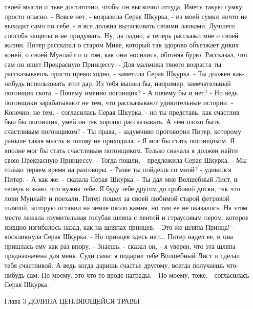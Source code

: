 твоей мысли о льве достаточно, чтобы он выскочил оттуда. Иметь такую 
сумку просто опасно.
    - Вовсе нет, - возразила Серая Шкурка, - из моей сумки ничто не 
выходит само по себе, - я все должна вытаскивать своими лапками. 
Лучшего способа защиты и не придумать. Ну, да ладно, а теперь расскажи 
мне о своей жизни.
    Питер рассказал о старом Мике, который так здорово объезжает диких 
коней, о своей Мунлайт и о том, как они носились, обгоняя бурю. 
Рассказал, что сам он ищет Прекрасную Принцессу.
    - Для мальчика твоего возраста ты рассказываешь просто 
превосходно, - заметила Серая Шкурка. - Ты должен как-нибудь 
использовать этот дар. Из тебя вышел бы, например, замечательный 
погонщик скота.
    - Почему именно погонщик?
    - А почему бы и нет?
    - Но ведь погонщики зарабатывают не тем, что рассказывают 
удивительные истории.
    - Конечно, не тем, - согласилась Серая Шкурка, - но ты представь, 
как счастлив был бы погонщик, умей он так хорошо рассказывать. А чем 
плохо быть счастливым погонщиком?
    - Ты права, - задумчиво проговорил Питер, которому раньше такая 
мысль в голову не приходила. - Я мог бы стать погонщиком. Я вполне мог 
бы стать счастливым погонщиком. Только сначала я должен найти свою 
Прекрасную Принцессу.
    - Тогда пошли, - предложила Серая Шкурка. - Мы только теряем время 
на разговоры.
    - Разве ты пойдешь со мной? - удивился Питер.
    - А как же, - сказала Серая Шкурка. - Ты дал мне Волшебный Лист, и 
теперь я знаю, что нужна тебе. Я буду тебе другом до гробовой доски, 
так что лови Мунлайт и поехали.
    Питер пошел за своей любимой старой фетровой шляпой, которую 
оставил на земле около камня, но там ее не оказалось. На этом месте 
лежала изумительная голубая шляпа с лентой и страусовым пером, которое 
изящно изгибалось назад, как на шляпах принцев.
    - Это же шляпа Принца! - воскликнула Серая Шкурка. - Но принцев 
здесь нет...
    Питер надел ее, и она пришлась ему как раз впору.
    - Знаешь, - сказал он, - я уверен, что эта шляпа предназначена для 
меня. Суди сама: я подарил тебе Волшебный Лист и сделал тебя 
счастливой. А ведь когда даришь счастье другому, всегда получаешь что-
нибудь сам. По-моему, это что-то вроде награды.
    - По-моему, тоже, - согласилась Серая Шкурка.

        Глава 3
        ДОЛИНА ЦЕПЛЯЮЩЕЙСЯ ТРАВЫ

